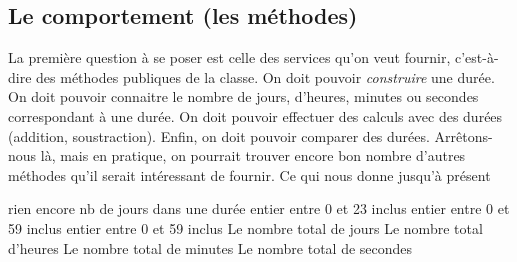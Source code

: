 	\subsection{Le comportement (les méthodes)}
	
		La première question à se poser est celle des services qu’on veut
		fournir, c’est-à-dire des méthodes publiques de la classe. On doit
		pouvoir \textit{construire} une durée. On doit pouvoir connaitre le
		nombre de jours, d’heures, minutes ou secondes correspondant à une durée. On doit
		pouvoir effectuer des calculs avec des durées (addition, soustraction).
		Enfin, on doit pouvoir comparer des durées. Arrêtons-nous là, mais en
		pratique, on pourrait trouver encore bon nombre d’autres méthodes qu’il
		serait intéressant de fournir. Ce qui nous donne jusqu’à présent
		
		\begin{Pseudocode}
				\Private
					\LComment rien encore
				\Public
					\Empty
					\RComment nb de jours dans une durée
					\RComment entier entre 0 et 23 inclus
					\RComment entier entre 0 et 59 inclus
					\RComment entier entre 0 et 59 inclus
					\Empty
					\RComment Le nombre total de jours
					\RComment Le nombre total d’heures
					\RComment Le nombre total de minutes
					\RComment Le nombre total de secondes
					\Empty
			\EndClass
		\end{Pseudocode}
		

